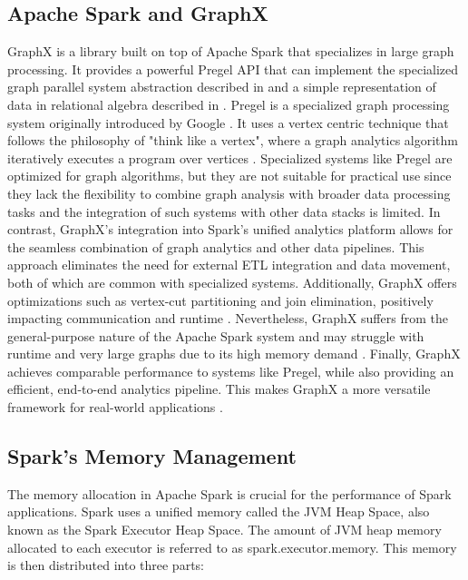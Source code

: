 \subsection{Apache Spark and GraphX}


GraphX is a library built on top of Apache Spark that specializes in large graph processing. It provides a powerful Pregel API that can implement the specialized graph parallel system abstraction described in\cite{malewicz_pregel_2010} and a simple representation of data in relational algebra described in \cite{xin_graphx_2014}. Pregel is a specialized graph processing system originally introduced by Google \cite{malewicz_pregel_2010}. It uses a vertex centric technique that follows the philosophy of "think like a vertex", where a graph analytics algorithm iteratively executes a program over vertices \cite{xin_graphx_2014}. 
Specialized systems like Pregel are optimized for graph algorithms, but they are not suitable for practical use since they lack the flexibility to combine graph analysis with broader data processing tasks and the integration of such systems with other data stacks is limited. In contrast, GraphX's integration into Spark's unified analytics platform allows for the seamless combination of graph analytics and other data pipelines. This approach eliminates the need for external ETL integration and data movement, both of which are common with specialized systems. Additionally, GraphX offers optimizations such as vertex-cut partitioning and join elimination, positively impacting communication and runtime \cite{xin_graphx_2014}. Nevertheless, GraphX suffers from the general-purpose nature of the Apache Spark system and may struggle with runtime and very large graphs due to its high memory demand \cite{zhuo_distributed_2021}.  
Finally, GraphX achieves comparable performance to systems like Pregel, while also providing an efficient, end-to-end analytics pipeline. This makes GraphX a more versatile framework for real-world applications \cite{xin_graphx_2014}.

\subsection{Spark's Memory Management}
The memory allocation in Apache Spark is crucial for the performance of Spark applications. Spark uses a unified memory called the JVM Heap Space, also known as the Spark Executor Heap Space. The amount of JVM heap memory allocated to each executor is referred to as spark.executor.memory. This memory is then distributed into three parts: 

